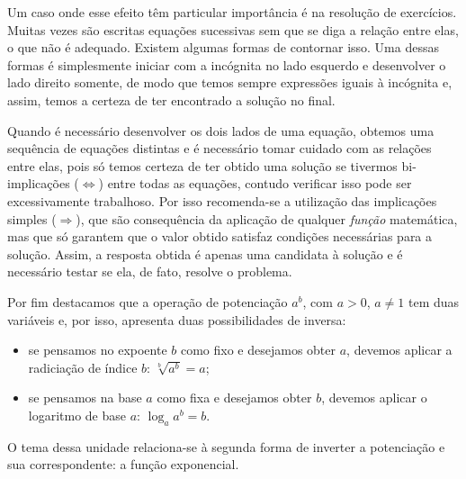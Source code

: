 \begin{apresentacao}
Um caso onde esse efeito têm particular importância é na resolução de exercícios. Muitas vezes são escritas equações sucessivas sem que se diga a relação entre elas, o que não é adequado. Existem algumas formas de contornar isso. Uma dessas formas é simplesmente iniciar com a incógnita no lado esquerdo e desenvolver o lado direito somente, de modo que temos sempre expressões iguais à incógnita e, assim, temos a certeza de ter encontrado a solução no final.

Quando é necessário desenvolver os dois lados de uma equação, obtemos uma sequência de equações distintas e é necessário tomar cuidado com as relações entre elas, pois só temos certeza de ter obtido uma solução se tivermos bi-implicações ($\Longleftrightarrow$) entre todas as equações, contudo verificar isso pode ser excessivamente trabalhoso. Por isso recomenda-se a utilização das implicações simples ($\Rightarrow$), que são consequência da aplicação de qualquer \textit{função} matemática, mas que só garantem que o valor obtido satisfaz condições necessárias para a solução. Assim, a resposta obtida é apenas uma candidata à solução e é necessário testar se ela, de fato, resolve o problema.

Por fim destacamos que a operação de potenciação $a^b$, com $a>0$, $a\neq 1$ tem duas variáveis e, por isso, apresenta duas possibilidades de inversa:
\begin{itemize}
\item se pensamos no expoente $b$ como fixo e desejamos obter $a$, devemos aplicar a radiciação de índice $b$: $\sqrt[b]{a^b}=a$;
\item se pensamos na base $a$ como fixa e desejamos obter $b$, devemos aplicar o logaritmo de base $a$: $\log_a a^b =b$.
\end{itemize}
O tema dessa unidade relaciona-se à segunda forma de inverter a potenciação e sua correspondente: a função exponencial.
\end{apresentacao}

